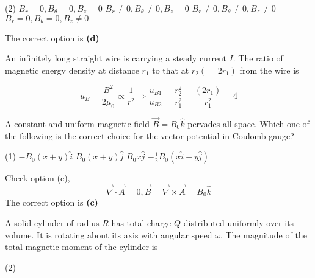 \begin{enumerate}
\begin{minipage}{\textwidth}
	\end{minipage}
	\begin{tasks}(2)
		\task[\textbf{A.}] $B_{r}=0, B_{\theta}=0, B_{z}=0$
		\task[\textbf{B.}]$B_{r} \neq 0, B_{\theta} \neq 0, B_{z}=0$
		\task[\textbf{C.}] $B_{r} \neq 0, B_{\theta} \neq 0, B_{z} \neq 0$
		\task[\textbf{D.}] $B_{r}=0, B_{\theta}=0, B_{z} \neq 0$
	\end{tasks}
	\begin{answer}
		The correct option is \textbf{(d)}	
	\end{answer}
	\begin{minipage}{\textwidth}
		\item An infinitely long straight wire is carrying a steady current $I$. The ratio of magnetic energy density at distance $r_{1}$ to that at $r_{2}\left(=2 r_{1}\right)$ from the wire is
	\end{minipage}
	\begin{answer}
		$$ u_{B}=\frac{B^{2}}{2 \mu_{0}} \propto \frac{1}{r^{2}} \Rightarrow \frac{u_{B 1}}{u_{B 2}}=\frac{r_{2}^{2}}{r_{1}^{2}}=\frac{\left(2 r_{1}\right)}{r_{1}^{2}}=4$$	
	\end{answer}
	\begin{minipage}{\textwidth}
		\item A constant and uniform magnetic field $\vec{B}=B_{0} \hat{k}$ pervades all space. Which one of the following is the correct choice for the vector potential in Coulomb gauge?
	\end{minipage}
	\begin{tasks}(1)
		\task[\textbf{A.}] $-B_{0}(x+y) \hat{i}$
		\task[\textbf{B.}]$B_{0}(x+y) \hat{j}$
		\task[\textbf{C.}] $B_{0} x \hat{j}$
		\task[\textbf{D.}]$-\frac{1}{2} B_{0}(x \hat{i}-y \hat{j})$
	\end{tasks}
	\begin{answer}
		Check option (c),
		$$
		\vec{\nabla} \cdot \vec{A}=0, \vec{B}=\vec{\nabla} \times \vec{A}=B_{0} \hat{k}
		$$
		The correct option is \textbf{(c)}
	\end{answer}
	\begin{minipage}{\textwidth}
		\item  A solid cylinder of radius $R$ has total charge $Q$ distributed uniformly over its volume. It is rotating about its axis with angular speed $\omega$. The magnitude of the total magnetic moment of the cylinder is
	\end{minipage}
	\begin{tasks}(2)

\end{tasks}
\end{enumerate}
